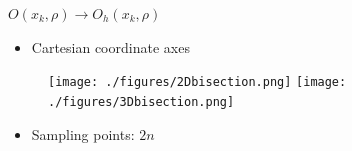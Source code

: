 \documentclass{beamer}
\begin{document}
\begin{frame}{$O(x_k, \rho)\rightarrow O_h(x_k, \rho)$}


	\begin{itemize}
		\item Cartesian coordinate axes
	\end{itemize}
\begin{figure}[!htbp]
	\centering
	  \texttt{[image: ./figures/2Dbisection.png]}
	  \hspace{1cm}
	  \texttt{[image: ./figures/3Dbisection.png]}
\label{fig:gauss:2drand}
\end{figure}
		\begin{itemize}
			\item Sampling points: $2n$
		\end{itemize}
\end{frame}
\end{document}
